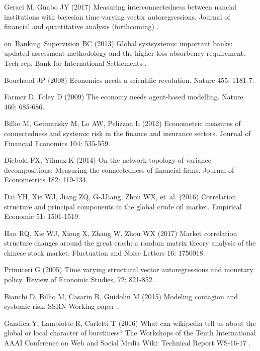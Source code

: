 \documentclass[a4paper,10pt]{article}
\begin{document}
%
\begin{thebibliography}{100}
Geraci M, Gnabo JY (2017) Measuring interconnectedness between nancial
  institutions with bayesian time-varying vector autoregressions.
\newblock Journal of financial and quantitative analysis (forthcoming) .

on~Banking~Supervision BC (2013) Global systsystemic important banks: updated
  assessment methodology and the higher loss absorbency requirement.
\newblock Tech rep, Bank for International Settlements .

Bouchaud JP (2008) Economics needs a scientific revolution.
\newblock Nature 455: 1181-7.

Farmer D, Foley D (2009) The economy needs agent-based modelling.
\newblock Nature 460: 685-686.

Billio M, Getmansky M, Lo AW, Pelizzon L (2012) Econometric measures of
  connectedness and systemic risk in the finance and insurance sectors.
\newblock Journal of Financial Economics 104: 535-559.

Diebold FX, Yilmaz K (2014) On the network topology of variance decompositions:
  Measuring the connectedness of financial firms.
\newblock Journal of Econometrics 182: 119-134.

Dai YH, Xie WJ, Jiang ZQ, G-JJiang, Zhou WX, et~al. (2016) Correlation
  structure and principal components in the global crude oil market.
\newblock Empirical Economic 51: 1501-1519.

Han RQ, Xie WJ, Xiong X, Zhang W, Zhou WX (2017) Market correlation structure
  changes around the great crash: a random matrix theory analysis of the
  chinese stock market.
\newblock Fluctuation and Noise Letters 16: 1750018.

Primiceri G (2005) Time varying structural vector autoregressions and monetary
  policy.
\newblock Review of Economic Studies, 72: 821-852.

Bianchi D, Billio M, Casarin R, Guidolin M (2015) Modeling contagion and
  systemic risk.
\newblock SSRN Working paper .

Gandica Y, Lambiotte R, Carletti T (2016) What can wikipedia tell us about the
  global or local character of burstiness?
\newblock The Workshops of the Tenth International AAAI Conference on Web and
  Social Media Wiki: Technical Report WS-16-17 .


\end{thebibliography}
\end{document}

